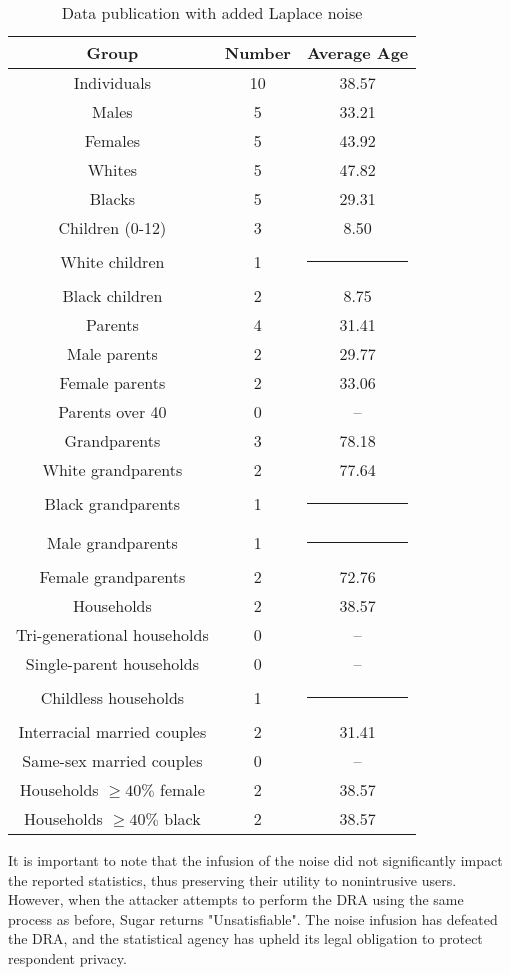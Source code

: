 \documentclass[5p,times,11pt]{elsarticle}
\begin{document}
\begin{table}[t]
\begin{tabular}{c|c|c}
Group & Number & Average Age \\
\hline
Individuals & 10 & 38.57 \\
Males & 5 & 33.21 \\
Females & 5 & 43.92 \\
Whites & 5 & 47.82 \\
Blacks & 5 & 29.31 \\
\hline
Children (0-12) & 3 & 8.50 \\
White children & 1 & \multicolumn{1}{c}{\rule{6mm}{3mm}} \\
Black children & 2 & 8.75 \\
\hline
Parents & 4 & 31.41 \\
Male parents & 2 & 29.77 \\
Female parents & 2 & 33.06 \\
Parents over 40 & 0 & -- \\
\hline
Grandparents & 3 & 78.18 \\
White grandparents & 2 & 77.64 \\
Black grandparents & 1 & \multicolumn{1}{c}{\rule{6mm}{3mm}} \\
Male grandparents & 1 & \multicolumn{1}{c}{\rule{6mm}{3mm}} \\
Female grandparents & 2 & 72.76 \\
\hline
Households & 2 & 38.57 \\
Tri-generational households & 0 & -- \\
Single-parent households & 0 & -- \\
Childless households & 1 & \multicolumn{1}{c}{\rule{6mm}{3mm}} \\
Interracial married couples & 2 & 31.41 \\
Same-sex married couples & 0 & -- \\
Households $\geq 40\% $ female & 2 & 38.57 \\
Households $\geq 40\% $ black & 2 & 38.57 \\

\hline
\end{tabular}
\caption{Data publication with added Laplace noise}\label{publishedstatsnoise}
\end{table}
It is important to note that the infusion of the noise did not significantly impact the reported statistics, thus preserving their utility to nonintrusive users. However, when the attacker attempts to perform the DRA using the same process as before, Sugar returns "Unsatisfiable". The noise infusion has defeated the DRA, and the statistical agency has upheld its legal obligation to protect respondent privacy.
\end{document}
